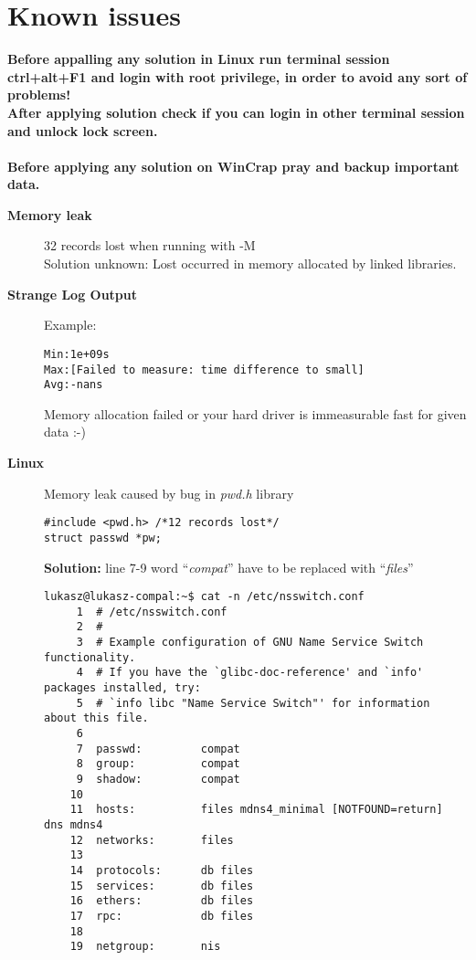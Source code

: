\hypertarget{KnownIssues}{
\section{Known issues}
\label{KnownIssues}
}

{\bf Before appalling any solution in Linux run terminal session ctrl+alt+F1 and login with root privilege, in order to avoid any sort of problems!\\
After applying solution check if you can login in other terminal session and unlock lock screen.\\ \\
}
{\bf Before applying any solution on WinCrap pray and backup important data.
}

\begin{description}
\item [\bf{Memory leak}] 32 records lost when running with -M\\ Solution unknown: Lost occurred in memory allocated by linked libraries.
\item [\bf{Strange Log Output}] Example: \begin{verbatim}
Min:1e+09s
Max:[Failed to measure: time difference to small]
Avg:-nans
\end{verbatim} Memory allocation failed or your hard driver is immeasurable fast for given data :-)

\item [{\bf Linux}] Memory leak caused by bug in {\itshape pwd.h} library
\begin{verbatim}
#include <pwd.h> /*12 records lost*/
struct passwd *pw;
\end{verbatim}
{\bf Solution:} line 7-9 word ``{\itshape compat}'' have to be replaced with ``{\itshape files}''
\begin{verbatim}
lukasz@lukasz-compal:~$ cat -n /etc/nsswitch.conf 
     1	# /etc/nsswitch.conf
     2	#
     3	# Example configuration of GNU Name Service Switch functionality.
     4	# If you have the `glibc-doc-reference' and `info' packages installed, try:
     5	# `info libc "Name Service Switch"' for information about this file.
     6	
     7	passwd:         compat
     8	group:          compat
     9	shadow:         compat
    10	
    11	hosts:          files mdns4_minimal [NOTFOUND=return] dns mdns4
    12	networks:       files
    13	
    14	protocols:      db files
    15	services:       db files
    16	ethers:         db files
    17	rpc:            db files
    18	
    19	netgroup:       nis
\end{verbatim}

\end{description}